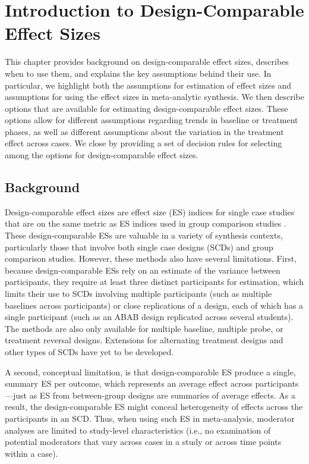 \documentclass[
]{book}
\begin{document}
\hypertarget{DC-ES}{%
\chapter{Introduction to Design-Comparable Effect Sizes}\label{DC-ES}}

This chapter provides background on design-comparable effect sizes, describes when to use them, and explains the key assumptions behind their use.
In particular, we highlight both the assumptions for estimation of effect sizes and assumptions for using the effect sizes in meta-analytic synthesis.
We then describe options that are available for estimating design-comparable effect sizes.
These options allow for different assumptions regarding trends in baseline or treatment phases, as well as different assumptions about the variation in the treatment effect across cases.
We close by providing a set of decision rules for selecting among the options for design-comparable effect sizes.

\hypertarget{background-1}{%
\section{Background}\label{background-1}}

Design-comparable effect sizes are effect size (ES) indices for single case studies that are on the same metric as ES indices used in group comparison studies \citep{Hedges2012ABk, Hedges2012MB, Pustejovsky2014design, Shadish2013d, Swaminathan2014effect, VandenNoortgate2008multilevel}. These design-comparable ESs are valuable in a variety of synthesis contexts, particularly those that involve both single case designs (SCDs) and group comparison studies. However, these methods also have several limitations. First, because design-comparable ESs rely on an estimate of the variance between participants, they require at least three distinct participants for estimation, which limits their use to SCDs involving multiple participants (such as multiple baselines across participants) or close replications of a design, each of which has a single participant (such as an ABAB design replicated across several students). The methods are also only available for multiple baseline, multiple probe, or treatment reversal designs. Extensions for alternating treatment designs and other types of SCDs have yet to be developed.

A second, conceptual limitation, is that design-comparable ES produce a single, summary ES per outcome, which represents an average effect across participants---just as ES from between-group designs are summaries of average effects. As a result, the design-comparable ES might conceal heterogeneity of effects across the participants in an SCD. Thus, when using such ES in meta-analysis, moderator analyses are limited to study-level characteristics (i.e., no examination of potential moderators that vary across cases in a study or across time points within a case).
\end{document}
